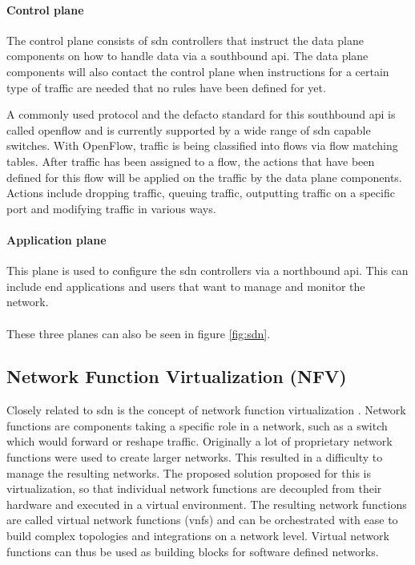 \paragraph{Control plane} The control plane consists of \acrshort{sdn} controllers that instruct the data plane components on how to handle data via a southbound \acrshort{api}. The data plane components will also contact the control plane when instructions for a certain type of traffic are needed that no rules have been defined for yet.

A commonly used protocol and the defacto standard for this southbound \acrshort{api} is called \Gls{openflow} \cite{openflow} and is currently supported by a wide range of \acrshort{sdn} capable switches. With OpenFlow, traffic is being classified into flows via flow matching tables. After traffic has been assigned to a flow, the actions that have been defined for this flow will be applied on the traffic by the data plane components. Actions include dropping traffic, queuing traffic, outputting traffic on a specific port and modifying traffic in various ways.

\paragraph{Application plane} This plane is used to configure the \acrshort{sdn} controllers via a northbound \acrshort{api}. This can include end applications and users that want to manage and monitor the network.

\paragraph{}These three planes can also be seen in figure \ref{fig:sdn}.

\subsection{Network Function Virtualization (NFV)}
Closely related to \acrshort{sdn} is the concept of network function virtualization \cite{nfv}. Network functions are components taking a specific role in a network, such as a switch which would forward or reshape traffic. Originally a lot of proprietary network functions were used to create larger networks. This resulted in a difficulty to manage the resulting networks. The proposed solution proposed for this is virtualization, so that individual network functions are decoupled from their hardware and executed in a virtual environment. The resulting network functions are called virtual network functions (\acrshort{vnf}s) and can be orchestrated with ease to build complex topologies and integrations on a network level. Virtual network functions can thus be used as building blocks for software defined networks.

